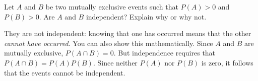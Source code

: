 \documentclass[addpoints,12pt]{exam}
\begin{document}
\begin{questions}
%

\question Let $A$ and $B$ be two mutually exclusive events such that $P(A)>0$ and $P(B)>0$. Are $A$ and $B$ independent? Explain why or why not.
\begin{solution} 
  They are not independent: knowing that one has occurred means that the other \emph{cannot have occurred}.
  You can also show this mathematically.
  Since $A$ and $B$ are mutually exclusive, $P(A\cap B) = 0$.
  But independence requires that $P(A\cap B) = P(A)P(B)$.
  Since neither $P(A)$ nor $P(B)$ is zero, it follows that the events cannot be independent.
\end{solution}


\end{questions}
\end{document}
